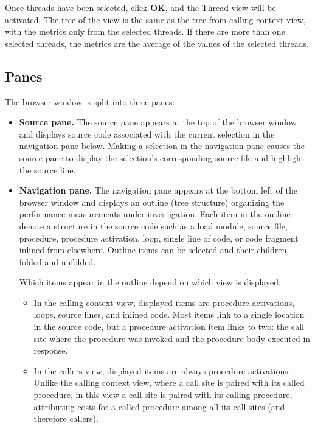 \documentclass[english]{article}
\begin{document}
\begin{itemize}
Once threads have been selected, click \textbf{OK}, and the Thread view will be activated. 
The tree of the view is the same as the tree from calling context view, with the metrics only from the selected threads.
If there are more than one selected threads, the metrics are the average of the values of the selected threads.


\end{itemize}


\subsection{Panes}

The browser window is split into three panes:

\begin{itemize}

\item \textbf{Source pane.} The source pane appears at the top of the browser window
and displays source code associated with the current selection in the navigation pane below.
Making a selection in the navigation pane causes the source pane
to display the selection's corresponding source file and highlight the source line.

\item \textbf{Navigation pane.}
The navigation pane appears at the bottom left of the browser window
and displays an outline (tree structure) organizing the performance measurements under investigation.
Each item in the outline denote a structure in the source code such as a
load module, source file, procedure, procedure activation,
loop, single line of code, or code fragment inlined from elsewhere.
Outline items can be selected and their children folded and unfolded.

Which items appear in the outline depend on which view is displayed: 

\begin{itemize}

\item In the calling context view, displayed items are
procedure activations, loops, source lines, and inlined code. 
Most items link to a single location in the source code,
but a procedure activation item links to two:
the call site where the procedure was invoked and the procedure body executed in response.

\item In the callers view, displayed items are always procedure activations.
Unlike the calling context view, where a call site is paired with its called procedure,
in this view a call site is paired with its calling procedure,
attributing costs for a called procedure among all its call sites (and therefore callers).


\end{itemize}
\end{itemize}
\end{document}
